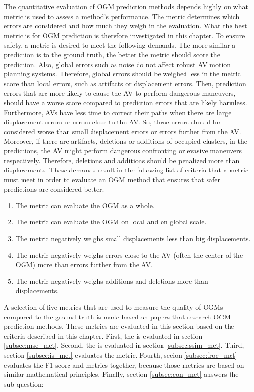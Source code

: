 The quantitative evaluation of \gls{OGM} prediction methods depends highly on what metric is used to assess a method's performance. The metric determines which errors are considered and how much they weigh in the evaluation. What the best metric is for \gls{OGM} prediction is therefore investigated in this chapter. To ensure safety, a metric is desired to meet the following demands. The more similar a prediction is to the ground truth, the better the metric should score the prediction. Also, global errors such as noise do not affect robust \gls{AV} motion planning systems. Therefore, global errors should be weighed less in the metric score than local errors, such as artifacts or displacement errors. Then, prediction errors that are more likely to cause the \gls{AV} to perform dangerous maneuvers, should have a worse score compared to prediction errors that are likely harmless. Furthermore, \glspl{AV} have less time to correct their paths when there are large displacement errors or errors close to the \gls{AV}. So, these errors should be considered worse than small displacement errors or errors further from the \gls{AV}. Moreover, if there are artifacts, deletions or additions of occupied clusters, in the predictions, the \gls{AV} might perform dangerous confronting or evasive maneuvers respectively. Therefore, deletions and additions should be penalized more than displacements. These demands result in the following list of criteria that a metric must meet in order to evaluate an \gls{OGM} method that ensures that safer predictions are considered better.
    
\begin{enumerate}
	\item The metric can evaluate the \gls{OGM} as a whole.
	\item The metric can evaluate the \gls{OGM} on local and on global scale.
	\item The metric negatively weighs small displacements less than big displacements. 
	\item The metric negatively weighs errors close to the \gls{AV} (often the center of the \gls{OGM}) more than errors further from the \gls{AV}.
	\item The metric negatively weighs additions and deletions more than displacements.
\end{enumerate}

A selection of five metrics that are used to measure the quality of \glspl{OGM} compared to the ground truth is made based on papers that research \gls{OGM} prediction methods. These metrics are evaluated in this section based on the criteria described in this chapter. First, the  is evaluated in section \ref{subsec:mse_met}. Second, the  is evaluated in section \ref{subsec:ssim_met}. Third, section \ref{subsec:is_met} evaluates the  metric. Fourth, secion \ref{subsec:froc_met} evaluates the F1 score and  metrics together, because those metrics are based on similar mathematical principles. Finally, section \ref{subsec:con_met} answers the sub-question: 

